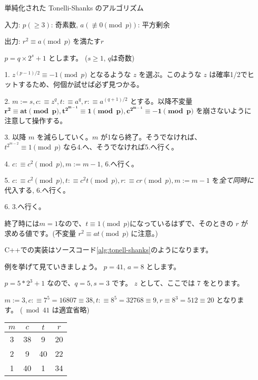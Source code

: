 \documentclass{jsarticle}
\begin{document}
\begin{algorithm}                      
\caption{単純化された Tonelli-Shanks のアルゴリズム}
\label{alg:simplified-tonelli-shanks}
入力: $p (\ge 3)$: 奇素数, $a (\not \equiv 0 \pmod p)$: 平方剰余

出力: $r^2 \equiv a \pmod p$ を満たす$r$

$p = q \times 2^s + 1$ とします。 ($s \ge 1$, $q$は奇数)

1. $z^{(p-1)/2} \equiv -1 \pmod p$ となるような $z$ を選ぶ。このような $z$ は確率1/2でヒットするため、何個か試せば必ず見つかる。

2. $m := s, c:\equiv z^q, t :\equiv a^q, r :\equiv a^{(q + 1)/2}$ とする。以降不変量 $\bm{r^2\equiv at \pmod p, t^{2^{m - 1}} \equiv 1 \pmod p, c^{2^{m-1}} \equiv -1 \pmod p}$ を崩さないように注意して操作する。

3. 以降 $m$ を減らしていく。$m$ が1なら終了。そうでなければ、$t^{2^{m-2}} \equiv 1 \pmod p$ なら4.へ、そうでなければ5.へ行く。

4. $c :\equiv c^2 \pmod p, m := m - 1$, 6.へ行く。

5. $c :\equiv c^2 \pmod p, t :\equiv c^2 t \pmod p, r :\equiv cr \pmod p, m := m - 1$ を\emph{全て同時に}代入する, 6.へ行く。

6. 3.へ行く。

\end{algorithm}
終了時には$m=1$なので、$t\equiv 1 \pmod p$になっているはずで、そのときの $r$ が求める値です。(不変量 $r^2\equiv at \pmod p$ に注意。)



C++での実装はソースコード\ref{alg:tonell-shanks}のようになります。


例を挙げて見ていきましょう。
$p = 41$, $a = 8$ とします。

$p = 5 * 2^3 + 1$ なので、$q = 5, s = 3$ です。
$z$ として、ここでは 7 をとります。

$m := 3, c :\equiv 7^5 = 16807 \equiv 38, t :\equiv 8^5 = 32768 \equiv 9, r \equiv 8^3 = 512 \equiv 20$ となります。 (${} \bmod 41$ は適宜省略)

 \begin{table}[htb]
  \begin{center}
  \begin{tabular}[t]{|c|c|c|c|}
   \hline
   $m$ & $c$ & $t$ & $r$ \\ \hline
   3 & 38 & 9 & 20 \\
   2 & 9 & 40 & 22 \\
   1 & 40 & 1 & 34 \\ \hline
  \end{tabular}
  \end{center}
 \end{table}
\end{document}
